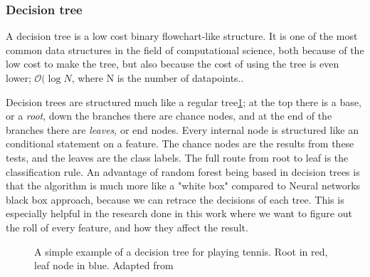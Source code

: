 \subsubsection{Decision tree}

A decision tree is a low cost binary flowchart-like structure. It is one of the most common data structures in the field of computational science, both because of the low cost to make the tree, but also because the cost of using the tree is even lower; $\mathcal{O}(\log{N}$, where N is the number of datapoints.\cite{marsland2014machine}. 

Decision trees are structured much like a regular tree\ref{fig:decision_tree}; at the top there is a base, or a \textit{root}, down the branches there are chance nodes, and at the end of the branches there are \textit{leaves}, or end nodes. Every internal node is structured like an conditional statement on a feature. The chance nodes are the results from these tests, and the leaves are the class labels. The full route from root to leaf is the classification rule. An advantage of random forest being based in decision trees is that the algorithm is much more like a "white box" compared to Neural networks black box approach, because we can retrace the decisions of each tree. This is especially helpful in the research done in this work where we want to figure out the roll of every feature, and how they affect the result.

\begin{figure}
\caption{A simple example of a decision tree for playing tennis. Root in red, leaf node in blue. Adapted from \cite{fig:decision_tree}}
\label{fig:decision_tree}
\end{figure}



